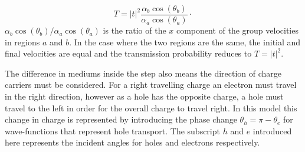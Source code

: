 		\begin{equation}
			T=|t|^{2}\frac{\alpha_{b}\cos(\theta_{b})}{\alpha_{a}\cos(\theta_{a})}\cdot
			\label{newT}
		\end{equation}
		$\alpha_{b}\cos(\theta_{b})/\alpha_{a}\cos(\theta_{a})$ is the ratio of the $x$ component of the group velocities in regions $a$ and $b$. In the case where the two regions are the same, the initial and final velocities are equal and the transmission probability reduces to $T=|t|^{2}$.

			The difference in mediums inside the step also means the direction of charge carriers must be considered. For a right travelling charge an electron must travel in the right direction, however as a hole has the opposite charge, a hole must travel to the left in order for the overall charge to travel right. In this model this change in charge is represented by introducing the phase change $\theta_{h}=\pi-\theta_{e}$ \cite{b40} for wave-functions that represent hole transport. The subscript $h$ and $e$ introduced here represents the incident angles for holes and electrons respectively.
